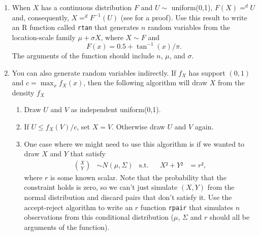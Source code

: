 \begin{enumerate}

\item When $X$ has a continuous distribution $F$ and $U ∼$
  uniform(0,1), $F(X) =^d U$ and, consequently, $X =^d F^{-1}(U)$ (see
  \citealt[Theorem 2.1.10]{CB02} for a proof).  Use this result to
  write an R function called \texttt{rtan} that generates $n$ random
  variables from the location-scale family $μ + σ X$, where $X ∼ F$
  and
  \begin{equation}
    \label{eq:1}
    F(x) = 0.5 + \tan^{-1}(x)/π.
  \end{equation}
  The arguments of the function should include $n$, $μ$, and $σ$.

\item You can also generate random variables indirectly.  If $f_X$ has
  support $(0,1)$ and $c = \max_x f_X(x)$, then the following
  algorithm will draw $X$ from the density $f_X$ \citep[see][Section
  5.6.2]{CB02}
  \begin{enumerate}
  \item Draw $U$ and $V$ as independent uniform(0,1).
  \item If $U ≤ f_X(V) / c$, set $X = V$.  Otherwise draw $U$ and $V$
    again.
  \item One case where we might need to use this algorithm is if we
    wanted to draw $X$ and $Y$ that satisfy
    \begin{align}\label{eq:prob_1}
      \binom{X}{Y} &∼ N(μ,Σ) & \text{s.t.}&& X² + Y² &= r²,
    \end{align}
    where $r$ is some known scalar.  Note that the probability that
    the constraint holds is zero, so we can't just simulate $(X,Y)$
    from the normal distribution and discard pairs that don't satisfy
    it.  Use the accept-reject algorithm to write an $r$ function
    \texttt{rpair} that simulates $n$ observations from this
    conditional distribution ($μ$, $Σ$ and $r$ should all be arguments
    of the function).
  \end{enumerate}


\end{enumerate}
